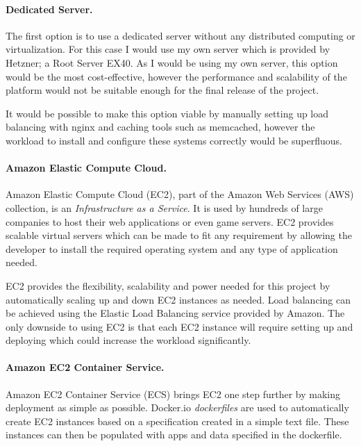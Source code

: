 \documentclass[a4paper, 12pt]{article}
\begin{document}
\paragraph{Dedicated Server.}
The first option is to use a dedicated server without any distributed computing or virtualization. For this case I would use my own server which is provided by Hetzner; a Root Server EX40. As I would be using my own server, this option would be the most cost-effective, however the performance and scalability of the platform would not be suitable enough for the final release of the project.

It would be possible to make this option viable by manually setting up load balancing with nginx and caching tools such as memcached, however the workload to install and configure these systems correctly would be superfluous.\cite{nginxloadbalancing,memcached}

\paragraph{Amazon Elastic Compute Cloud.}
Amazon Elastic Compute Cloud (EC2), part of the Amazon Web Services (AWS) collection, is an \emph{Infrastructure as a Service}.\cite{awsec2} It is used by hundreds of large companies to host their web applications or even game servers. EC2 provides scalable virtual servers which can be made to fit any requirement by allowing the developer to install the required operating system and any type of application needed.

EC2 provides the flexibility, scalability and power needed for this project by automatically scaling up and down EC2 instances as needed.\cite{awsec2} Load balancing can be achieved using the Elastic Load Balancing service provided by Amazon.\cite{elasticloadbalancing} The only downside to using EC2 is that each EC2 instance will require setting up and deploying which could increase the workload significantly.

\paragraph{Amazon EC2 Container Service.}
Amazon EC2 Container Service (ECS) brings EC2 one step further by making deployment as simple as possible. Docker.io \emph{dockerfiles} are used to automatically create EC2 instances based on a specification created in a simple text file.\cite{awsecs} These instances can then be populated with apps and data specified in the dockerfile.\cite{dockerfile}
\end{document}
